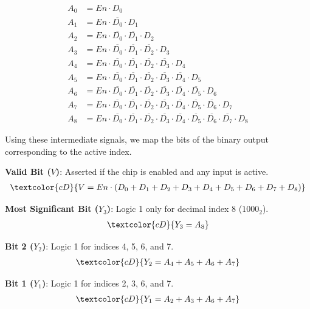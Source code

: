 \documentclass[12pt,a3paper]{article}
\begin{document}
\begin{enumerate}
\begin{tcolorbox}[enhanced,breakable,ansbox,colback=cD!4,colframe=cD,boxrule=0.8pt,arc=5pt,title={\textbf{Answer}},fonttitle=\bfseries\color{white},colbacktitle=cD]
\begin{align*}
    A_0 &= En \cdot D_0 \\
    A_1 &= En \cdot \overline{D_0} \cdot D_1 \\
    A_2 &= En \cdot \overline{D_0} \cdot \overline{D_1} \cdot D_2 \\
    A_3 &= En \cdot \overline{D_0} \cdot \overline{D_1} \cdot \overline{D_2} \cdot D_3 \\
    A_4 &= En \cdot \overline{D_0} \cdot \overline{D_1} \cdot \overline{D_2} \cdot \overline{D_3} \cdot D_4 \\
    A_5 &= En \cdot \overline{D_0} \cdot \overline{D_1} \cdot \overline{D_2} \cdot \overline{D_3} \cdot \overline{D_4} \cdot D_5 \\
    A_6 &= En \cdot \overline{D_0} \cdot \overline{D_1} \cdot \overline{D_2} \cdot \overline{D_3} \cdot \overline{D_4} \cdot \overline{D_5} \cdot D_6 \\
    A_7 &= En \cdot \overline{D_0} \cdot \overline{D_1} \cdot \overline{D_2} \cdot \overline{D_3} \cdot \overline{D_4} \cdot \overline{D_5} \cdot \overline{D_6} \cdot D_7 \\
    A_8 &= En \cdot \overline{D_0} \cdot \overline{D_1} \cdot \overline{D_2} \cdot \overline{D_3} \cdot \overline{D_4} \cdot \overline{D_5} \cdot \overline{D_6} \cdot \overline{D_7} \cdot D_8
\end{align*}

Using these intermediate signals, we map the bits of the binary output corresponding to the active index.

\textbf{Valid Bit ($V$)}: Asserted if the chip is enabled and any input is active.
\begin{align*}
    \textcolor{cD}{V = En \cdot (D_0 + D_1 + D_2 + D_3 + D_4 + D_5 + D_6 + D_7 + D_8)}
\end{align*}

\textbf{Most Significant Bit ($Y_3$)}: Logic 1 only for decimal index 8 ($1000_2$).
\begin{align*}
    \textcolor{cD}{Y_3 = A_8}
\end{align*}

\textbf{Bit 2 ($Y_2$)}: Logic 1 for indices 4, 5, 6, and 7.
\begin{align*}
    \textcolor{cD}{Y_2 = A_4 + A_5 + A_6 + A_7}
\end{align*}

\textbf{Bit 1 ($Y_1$)}: Logic 1 for indices 2, 3, 6, and 7.
\begin{align*}
    \textcolor{cD}{Y_1 = A_2 + A_3 + A_6 + A_7}
\end{align*}


\end{tcolorbox}
\end{enumerate}
\end{document}
